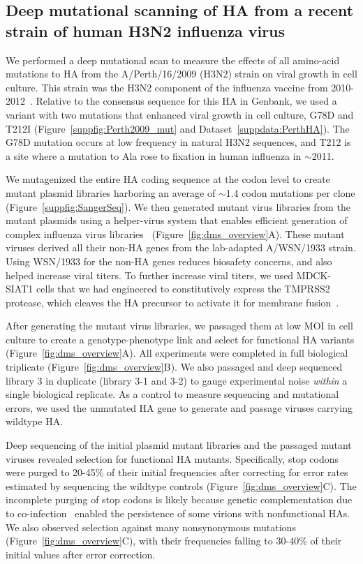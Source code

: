 \documentclass[9pt,twocolumn,twoside]{pnas-new-for-biorxiv}
\begin{document}
\subsection*{Deep mutational scanning of HA from a recent strain of human H3N2 influenza virus}
We performed a deep mutational scan to measure the effects of all amino-acid mutations to HA from the A/Perth/16/2009 (H3N2) strain on viral growth in cell culture.
This strain was the H3N2 component of the influenza vaccine from 2010-2012~\cite{who2010d,who2011}.
Relative to the consensus sequence for this HA in Genbank, we used a variant with two mutations that enhanced viral growth in cell culture, G78D and T212I (Figure~\ref{suppfig:Perth2009_mut} and Dataset~\ref{suppdata:PerthHA}).
The G78D mutation occurs at low frequency in natural H3N2 sequences, and T212 is a site where a mutation to Ala rose to fixation in human influenza in $\sim$2011.

We mutagenized the entire HA coding sequence at the codon level to create mutant plasmid libraries harboring an average of $\sim$1.4 codon mutations per clone (Figure~\ref{suppfig:SangerSeq}).
We then generated mutant virus libraries from the mutant plasmids using a helper-virus system that enables efficient generation of complex influenza virus libraries~\cite{doud2016accurate} (Figure~\ref{fig:dms_overview}A).
These mutant viruses derived all their non-HA genes from the lab-adapted A/WSN/1933 strain.
Using WSN/1933 for the non-HA genes reduces biosafety concerns, and also helped increase viral titers.
To further increase viral titers, we used MDCK-SIAT1 cells that we had engineered to constitutively express the TMPRSS2 protease, which cleaves the HA precursor to activate it for membrane fusion~\cite{bottcher2006proteolytic, bottcher2010cleavage}.

After generating the mutant virus libraries, we passaged them at low MOI in cell culture to create a genotype-phenotype link and select for functional HA variants (Figure~\ref{fig:dms_overview}A).
All experiments were completed in full biological triplicate (Figure~\ref{fig:dms_overview}B).
We also passaged and deep sequenced library 3 in duplicate (library 3-1 and 3-2) to gauge experimental noise \textit{within} a single biological replicate.
As a control to measure sequencing and mutational errors, we used the unmutated HA gene to generate and passage viruses carrying wildtype HA.

Deep sequencing of the initial plasmid mutant libraries and the passaged mutant viruses revealed selection for functional HA mutants.
Specifically, stop codons were purged to 20-45\% of their initial frequencies after correcting for error rates estimated by sequencing the wildtype controls (Figure~\ref{fig:dms_overview}C).
The incomplete purging of stop codons is likely because genetic complementation due to co-infection~\cite{marshall2013influenza, brooke2013most} enabled the persistence of some virions with nonfunctional HAs.
We also observed selection against many nonsynonymous mutations (Figure~\ref{fig:dms_overview}C), with their frequencies falling to 30-40\% of their initial values after error correction.
\end{document}
